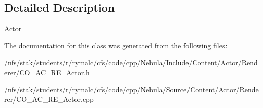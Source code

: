 \subsection{Detailed Description}
Actor 

The documentation for this class was generated from the following files:\begin{DoxyCompactItemize}
\item 
/nfs/stak/students/r/rymalc/cfs/code/cpp/Nebula/Include/Content/Actor/Renderer/CO\_\-AC\_\-RE\_\-Actor.h\item 
/nfs/stak/students/r/rymalc/cfs/code/cpp/Nebula/Source/Content/Actor/Renderer/CO\_\-AC\_\-RE\_\-Actor.cpp\end{DoxyCompactItemize}
